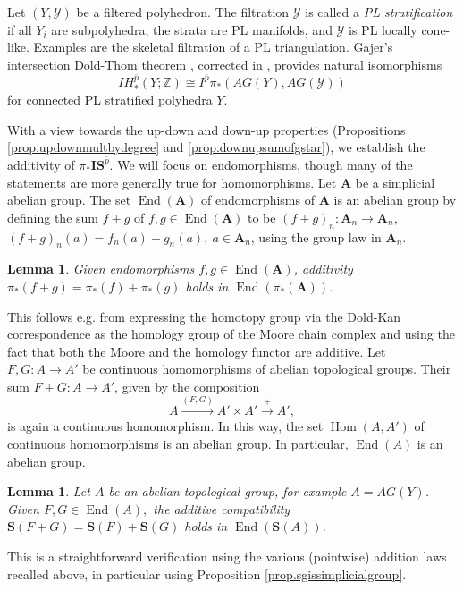\documentclass{amsart}
\newtheorem{lemma}[thm]{Lemma}
\theoremstyle{definition}
\theoremstyle{remark}
\newcommand {\Ya}    {\ensuremath{\mathcal{Y}}}
\newcommand {\intg}  {\ensuremath{\mathbb{Z}}}
\newcommand {\Hom}   {\ensuremath{\operatorname{Hom}}}
\newcommand {\End}   {\ensuremath{\operatorname{End}}}
\newcommand {\bp}    {{\ensuremath{\bar{p}}}}
\newcommand {\sA}    {\mathbf{A}}
\newcommand {\sS}    {\mathbf{S}}
\newcommand {\sIS}   {\mathbf{IS}}
\begin{document}
Let $(Y,\Ya)$ be a filtered polyhedron.
The filtration $\Ya$ is called a \emph{PL stratification}
if all $Y_i$ are subpolyhedra, the strata are PL manifolds,
and $\Ya$ is PL locally cone-like. Examples are the skeletal
filtration of a PL triangulation.
Gajer's intersection Dold-Thom theorem \cite{gajer}, corrected in \cite{gajercorrection},
provides natural isomorphisms
\[  IH^\bp_* (Y;\intg) \cong I^\bp \pi_* (AG(Y), AG (\Ya)) \]
for connected PL stratified polyhedra $Y$.

With a view towards the up-down and down-up properties
(Propositions \ref{prop.updownmultbydegree} and \ref{prop.downupsumofgstar}),
we establish the additivity of $\pi_* \sIS^\bp$. We will focus on endomorphisms,
though many of the statements are more generally true for homomorphisms.
Let $\sA$ be a simplicial abelian group.
The set $\End (\sA)$ of endomorphisms of $\sA$ is an abelian group
by defining the sum $f+g$ of $f,g \in \End (\sA)$ to be
$(f+g)_n:\sA_n \to \sA_n,$
$(f+g)_n (a) = f_n (a) + g_n (a),~ a\in \sA_n$, 
using the group law in $\sA_n$.

\begin{lemma} \label{lem.piadditive}
Given endomorphisms $f,g \in \End (\sA)$, additivity
$\pi_* (f+g) = \pi_* (f) + \pi_* (g)$
holds in $\End (\pi_* (\sA))$.
\end{lemma}
This follows e.g. from expressing the homotopy group via the 
Dold-Kan correspondence as the homology group of the Moore chain complex
and using the fact that both the Moore and the homology functor are additive.
Let $F,G:A \to A'$ be continuous homomorphisms of abelian topological
groups. Their sum $F+G:A \to A'$, given by the composition
\[ A \stackrel{(F,G)}{\longrightarrow}
  A' \times A' \stackrel{+}{\longrightarrow} A', \]
is again a continuous homomorphism.
In this way, the set $\Hom (A,A')$ of continuous homomorphisms is an abelian group.
In particular, $\End (A)$ is an abelian group.
\begin{lemma} \label{lem.singsimplsetfunctoradditive}
Let $A$ be an abelian topological group, for example $A=AG(Y)$.
Given $F,G \in \End(A),$ the additive compatibility
$\sS (F+G) = \sS (F) + \sS (G)$
holds in $\End (\sS (A))$.
\end{lemma}
This is a straightforward verification using the various (pointwise) addition laws
recalled above, in particular using Proposition \ref{prop.sgissimplicialgroup}.
\end{document}
